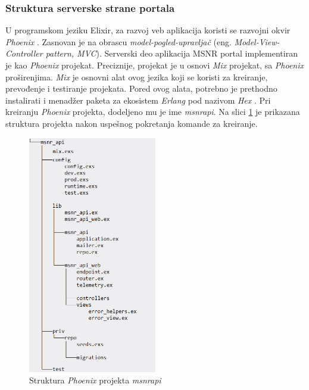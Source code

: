 \documentclass[12pt,oneside]{memoir}
\begin{document}
\subsubsection{Struktura serverske strane portala}
\par U programskom jeziku Elixir, za razvoj veb aplikacija koristi se razvojni okvir \emph{Phoenix} \cite{phx}. Zasnovan je na obrascu \emph{model-pogled-upravljač} (eng. \emph{Model-View-Controller pattern, MVC}). Serverski deo aplikacija MSNR portal implementiran je kao \emph{Phoenix} projekat. Preciznije, projekat je u osnovi \emph{Mix} projekat, sa \emph{Phoenix} proširenjima. \emph{Mix} je osnovni alat ovog jezika koji se koristi za kreiranje, prevođenje i testiranje projekata. Pored ovog alata, potrebno je prethodno instalirati i menadžer paketa za ekosistem \emph{Erlang} pod nazivom \emph{Hex} \cite{hex}. Pri kreiranju \emph{Phoenix} projekta, dodeljeno mu je ime \emph{msnr{\textunderscore}api}. Na slici \ref{fig:msnr-str} je prikazana struktura projekta nakon uspešnog pokretanja komande za kreiranje. 

\begin{figure}[!ht]
  \centering
  \includegraphics[width=0.5\textwidth]{msnr-str.png}
  \caption{Struktura \emph{Phoenix} projekta \emph{msnr{\textunderscore}api} \cite{rad}}
  \label{fig:msnr-str}
\end{figure}
\end{document}
